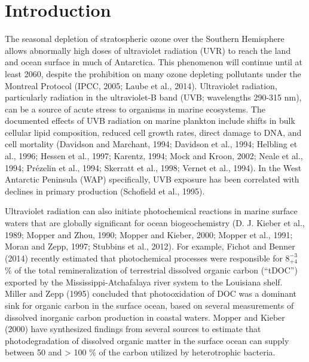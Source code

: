 \section{Introduction}

The seasonal depletion of stratospheric ozone over the Southern Hemisphere allows abnormally high doses of ultraviolet radiation (UVR) to reach the land and ocean surface in much of Antarctica. This phenomenon will continue until at least 2060, despite the prohibition on many ozone depleting pollutants under the Montreal Protocol (IPCC, 2005; Laube et al., 2014). Ultraviolet radiation, particularly radiation in the ultraviolet-B band (UVB; wavelengths 290-315 nm), can be a source of acute stress to organisms in marine ecosystems. The documented effects of UVB radiation on marine plankton include shifts in bulk cellular lipid composition, reduced cell growth rates, direct damage to DNA, and cell mortality (Davidson and Marchant, 1994; Davidson et al., 1994; Helbling et al., 1996; Hessen et al., 1997; Karentz, 1994; Mock and Kroon, 2002; Neale et al., 1994; Pr\'{e}zelin et al., 1994; Skerratt et al., 1998; Vernet et al., 1994). In the West Antarctic Peninsula (WAP) specifically, UVB exposure has been correlated with declines in primary production (Schofield et al., 1995).

Ultraviolet radiation can also initiate photochemical reactions in marine surface waters that are globally significant for ocean biogeochemistry (D. J. Kieber et al., 1989; Mopper and Zhou, 1990; Mopper and Kieber, 2000; Mopper et al., 1991; Moran and Zepp, 1997; Stubbins et al., 2012). For example, Fichot and Benner (2014) recently estimated that photochemical processes were responsible for $8_{ + 4}^{ - 3}$ \% of the total remineralization of terrestrial dissolved organic carbon (``tDOC'') exported by the Mississippi-Atchafalaya river system to the Louisiana shelf. Miller and Zepp (1995) concluded that photooxidation of DOC was a dominant sink for organic carbon in the surface ocean, based on several measurements of dissolved inorganic carbon production in coastal waters. Mopper and Kieber (2000) have synthesized findings from several sources to estimate that photodegradation of dissolved organic matter in the surface ocean can supply between 50 and \textgreater{} 100 \% of the carbon utilized by heterotrophic bacteria.


